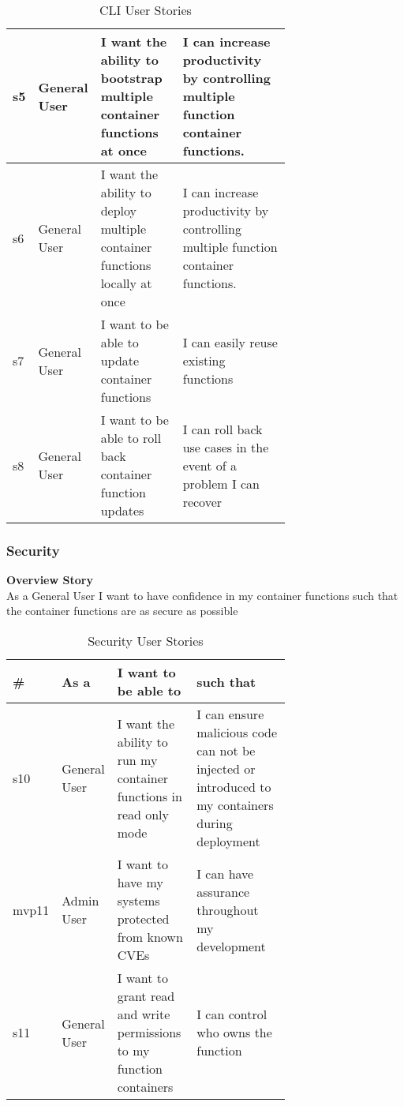 \documentclass{article}
\begin{document}
\begin{table}[!ht]
\begin{tabular}{|l|l|p{0.3\linewidth}|p{0.4\linewidth}|}
s5          & General User  & I want the ability to bootstrap multiple container functions at once      & I can increase productivity by controlling multiple function container functions.                                                                        \\ \hline
s6          & General User  & I want the ability to deploy multiple container functions locally at once & I can increase productivity by controlling multiple function container functions.                                                                        \\ \hline
s7          & General User  & I want to be able to update container functions                           & I can easily reuse existing functions                                                           \\ \hline
s8          & General User  & I want to be able to roll back container function updates                 & I can roll back use cases in the event of a problem I can recover                                                           \\ \hline
\end{tabular}
\caption{CLI User Stories}
\label{tab:cli}
\end{table}
\clearpage

\subsubsection{Security}
\textbf{Overview Story}
\\As a General User I want to have confidence in my container functions such that the container functions are as secure as possible
\begin{table}[!ht]
\begin{tabular}{|l|l|p{0.3\linewidth}|p{0.4\linewidth}|}
\hline
\textbf{\#} & \textbf{As a} & \textbf{I want to be able to}                                        & \textbf{such that}                                                                               \\ \hline
s10         & General User  & I want the ability to run my container functions in read only mode   & I can ensure malicious code can not be injected or introduced to my containers during deployment \\ \hline
mvp11        & Admin User    & I want to have my systems protected from known CVEs                  & I can have assurance throughout my development                                                   \\ \hline
s11         & General User  & I want to grant read and write permissions to my function containers & I can control who owns the function                                                              \\ \hline
\end{tabular}
\caption{Security User Stories}
\label{tab:security}
\end{table}
\end{document}
